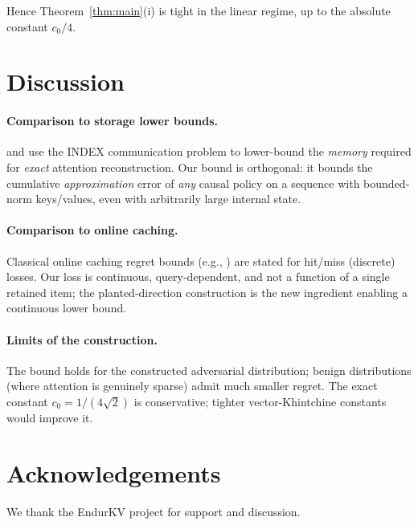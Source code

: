 \documentclass{article}
\theoremstyle{definition}
\theoremstyle{remark}
\begin{document}
Hence Theorem~\ref{thm:main}(i) is tight in the linear regime, up to the absolute constant $c_0/4$.

\section{Discussion}
\label{sec:discussion}

\paragraph{Comparison to storage lower bounds.} \citet{sadhukhan2025compression} and \citet{kochetkova2025balancekv} use the INDEX communication problem to lower-bound the \emph{memory} required for \emph{exact} attention reconstruction. Our bound is orthogonal: it bounds the cumulative \emph{approximation} error of \emph{any} causal policy on a sequence with bounded-norm keys/values, even with arbitrarily large internal state.

\paragraph{Comparison to online caching.} Classical online caching regret bounds (e.g., \citet{bhattacharjee2020online}) are stated for hit/miss (discrete) losses. Our loss is continuous, query-dependent, and not a function of a single retained item; the planted-direction construction is the new ingredient enabling a continuous lower bound.

\paragraph{Limits of the construction.} The bound holds for the constructed adversarial distribution; benign distributions (where attention is genuinely sparse) admit much smaller regret. The exact constant $c_0=1/(4\sqrt 2)$ is conservative; tighter vector-Khintchine constants \citep{haagerup1981best} would improve it.

\section*{Acknowledgements}
We thank the EndurKV project for support and discussion.
\end{document}
